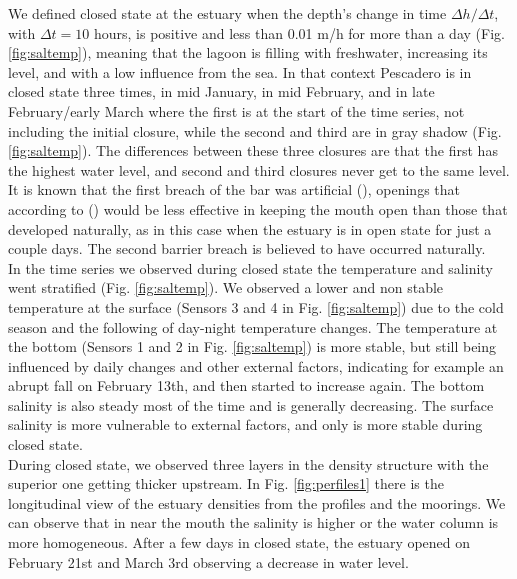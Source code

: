 \documentclass[tesis.tex]{subfiles}
\begin{document}
We defined closed state at the estuary when the depth's change in time $\Delta h/\Delta t$, with $\Delta t=10$ hours, is positive and less than 0.01 m/h for more than a day (Fig. \ref{fig:saltemp}), meaning that the lagoon is filling with freshwater, increasing its level, and with a low influence from the sea. In that context Pescadero is in closed state three times, in mid January, in mid February, and in late February/early March where the first is at the start of the time series, not including the initial closure, while the second and third are in gray shadow (Fig. \ref{fig:saltemp}). The differences between these three closures are that the first has the highest water level, and second and third closures never get to the same level. \\

It is known that the first breach of the bar was artificial (\cite{Williams2014}), openings that according to  (\cite*{Behrens2013}) would be less effective in keeping the mouth open than those that developed naturally, as in this case when the estuary is in open state for just a couple days. The second barrier breach is believed to have occurred naturally. \\

In the time series we observed during closed state the temperature and salinity went stratified (Fig. \ref{fig:saltemp}). We observed a lower and non stable temperature at the surface (Sensors 3 and 4 in Fig. \ref{fig:saltemp}) due to the cold season and the following of day-night temperature changes. The temperature at the bottom (Sensors 1 and 2 in Fig. \ref{fig:saltemp}) is more stable, but still being influenced by daily changes and other external factors, indicating for example an abrupt fall on February 13th, and then started to increase again. The bottom salinity is also steady most of the time and is generally decreasing. The surface salinity is more vulnerable to external factors, and only is more stable during closed state. \\ 

During closed state, we observed three layers in the density structure with the superior one getting thicker upstream. In Fig. \ref{fig:perfiles1} there is the longitudinal view of the estuary densities from the profiles and the moorings. We can observe that in near the mouth the salinity is higher or the water column is more homogeneous. After a few days in closed state, the estuary opened on February 21st and March 3rd observing a decrease in water level. \\
\end{document}
